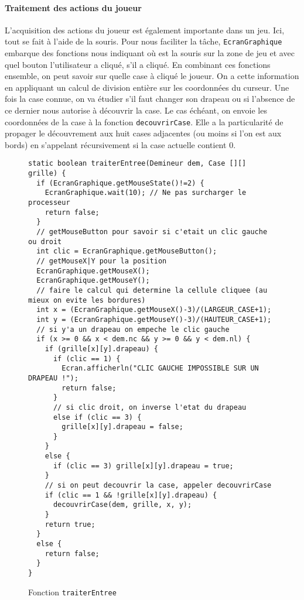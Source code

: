\documentclass[a4paper, 12pt, oneside]{article}
\newcommand{\var}[1]{\texttt{#1}}
\begin{document}
\paragraph{Traitement des actions du joueur} L'acquisition des actions du joueur est également importante dans un jeu. Ici, tout se fait à l'aide de la souris. Pour nous faciliter la tâche, \var{EcranGraphique} embarque des fonctions nous indiquant où est la souris sur la zone de jeu et avec quel bouton l'utilisateur a cliqué, s'il a cliqué. En combinant ces fonctions ensemble, on peut savoir sur quelle case à cliqué le joueur. On a cette information en appliquant un calcul de division entière sur les coordonnées du curseur. Une fois la case connue, on va étudier s'il faut changer son drapeau ou si l'absence de ce dernier nous autorise à découvrir la case. Le cas échéant, on envoie les coordonnées de la case à la fonction \var{decouvrirCase}. Elle a la particularité de propager le découvrement aux huit cases adjacentes (ou moins si l'on est aux bords) en s'appelant récursivement si la case actuelle contient $0$.

\begin{figure}[hpt]
	\center
	\caption{\label{fig:fnTraiterEntree} Fonction \var{traiterEntree}}
\begin{lstlisting}
static boolean traiterEntree(Demineur dem, Case [][] grille) {
  if (EcranGraphique.getMouseState()!=2) {
    EcranGraphique.wait(10); // Ne pas surcharger le processeur
    return false;
  }
  // getMouseButton pour savoir si c'etait un clic gauche ou droit
  int clic = EcranGraphique.getMouseButton();
  // getMouseX|Y pour la position
  EcranGraphique.getMouseX();
  EcranGraphique.getMouseY();
  // faire le calcul qui determine la cellule cliquee (au mieux on evite les bordures)
  int x = (EcranGraphique.getMouseX()-3)/(LARGEUR_CASE+1);
  int y = (EcranGraphique.getMouseY()-3)/(HAUTEUR_CASE+1);
  // si y'a un drapeau on empeche le clic gauche
  if (x >= 0 && x < dem.nc && y >= 0 && y < dem.nl) {
    if (grille[x][y].drapeau) {
      if (clic == 1) {
        Ecran.afficherln("CLIC GAUCHE IMPOSSIBLE SUR UN DRAPEAU !");
        return false;
      }
      // si clic droit, on inverse l'etat du drapeau
      else if (clic == 3) {
        grille[x][y].drapeau = false;
      }
    }
    else {
      if (clic == 3) grille[x][y].drapeau = true;
    }
    // si on peut decouvrir la case, appeler decouvrirCase
    if (clic == 1 && !grille[x][y].drapeau) {
      decouvrirCase(dem, grille, x, y);
    }
    return true;
  }
  else {
    return false;
  }
}
\end{lstlisting}
\end{figure}
\end{document}
